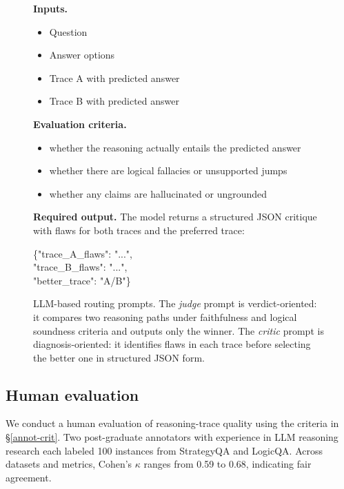 \documentclass{article}
\begin{document}
\begin{figure}[t]
\begin{minipage}[t]{0.485\textwidth}
\begin{tcolorbox}[promptcard,title=LLM-as-Critic]
\vspace{2pt}
\textbf{Inputs.}
\begin{itemize}
    \setlength{\itemsep}{1pt}
    \item Question
    \item Answer options
    \item Trace A with predicted answer
    \item Trace B with predicted answer
\end{itemize}

\vspace{-2pt}
\textbf{Evaluation criteria.}
\begin{itemize}
    \setlength{\itemsep}{1pt}
    \item whether the reasoning actually entails the predicted answer
    \item whether there are logical fallacies or unsupported jumps
    \item whether any claims are hallucinated or ungrounded
\end{itemize}

\vspace{-2pt}
\textbf{Required output.}
The model returns a structured JSON critique with flaws for both traces and the preferred trace:
\begin{center}
\ttfamily
\{"trace\_A\_flaws": "...",\\
"trace\_B\_flaws": "...",\\
"better\_trace": "A/B"\}
\end{center}
\end{tcolorbox}
\end{minipage}

\vspace{2pt}
\caption{LLM-based routing prompts. The \emph{judge} prompt is verdict-oriented: it compares two reasoning paths under faithfulness and logical soundness criteria and outputs only the winner. The \emph{critic} prompt is diagnosis-oriented: it identifies flaws in each trace before selecting the better one in structured JSON form.}
\label{fig:judge_critic_prompts}
\end{figure}




\subsection{Human evaluation}\label{app:human_eval}
We conduct a human evaluation of reasoning-trace quality using the criteria in \S\ref{annot-crit}. Two post-graduate annotators with experience in LLM reasoning research each labeled 100 instances from StrategyQA and LogicQA. Across datasets and metrics, Cohen's \(\kappa\) ranges from 0.59 to 0.68, indicating fair agreement.
\end{document}
